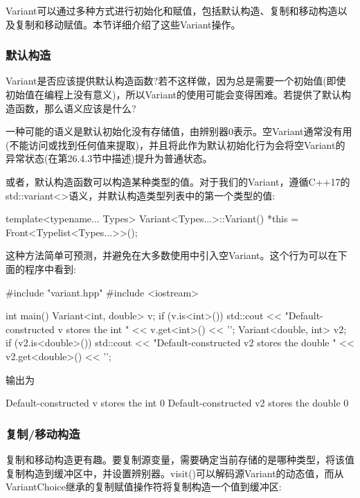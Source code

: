 Variant可以通过多种方式进行初始化和赋值，包括默认构造、复制和移动构造以及复制和移动赋值。本节详细介绍了这些Variant操作。

\subsubsection{默认构造}

Variant是否应该提供默认构造函数?若不这样做，因为总是需要一个初始值(即使初始值在编程上没有意义)，所以Variant的使用可能会变得困难。若提供了默认构造函数，那么语义应该是什么?

一种可能的语义是默认初始化没有存储值，由辨别器0表示。空Variant通常没有用(不能访问或找到任何值来提取)，并且将此作为默认初始化行为会将空Variant的异常状态(在第26.4.3节中描述)提升为普通状态。

或者，默认构造函数可以构造某种类型的值。对于我们的Variant，遵循C++17的std::variant<>语义，并默认构造类型列表中的第一个类型的值:

\begin{cpp}
template<typename... Types>
Variant<Types...>::Variant() {
	*this = Front<Typelist<Types...>>();
}
\end{cpp}

这种方法简单可预测，并避免在大多数使用中引入空Variant。这个行为可以在下面的程序中看到:

\begin{cpp}
#include "variant.hpp"
#include <iostream>

int main()
{
	Variant<int, double> v;
	if (v.is<int>()) {
		std::cout << "Default-constructed v stores the int "
		<< v.get<int>() << ’\n’;
	}
	Variant<double, int> v2;
	if (v2.is<double>()) {
		std::cout << "Default-constructed v2 stores the double "
				<< v2.get<double>() << ’\n’;
	}
}
\end{cpp}

输出为

\begin{shell}
Default-constructed v stores the int 0
Default-constructed v2 stores the double 0
\end{shell}

\subsubsection{复制/移动构造}

复制和移动构造更有趣。要复制源变量，需要确定当前存储的是哪种类型，将该值复制构造到缓冲区中，并设置辨别器。visit()可以解码源Variant的动态值，而从VariantChoice继承的复制赋值操作符将复制构造一个值到缓冲区:

